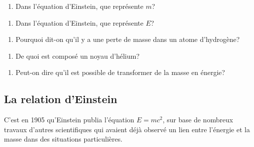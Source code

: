\documentclass[
  letterpaper,
  DIV=11,
  numbers=noendperiod]{scrartcl}
\providecommand{\tightlist}{%
  \setlength{\itemsep}{0pt}\setlength{\parskip}{0pt}}\usepackage{longtable,booktabs,array}
\begin{document}
\vspace{1cm}

\begin{enumerate}
\def\labelenumi{\arabic{enumi}.}
\setcounter{enumi}{5}
\tightlist
\item
  Dans l'équation d'Einstein, que représente \(m\)?
\end{enumerate}

\vspace{1cm}

\begin{enumerate}
\def\labelenumi{\arabic{enumi}.}
\setcounter{enumi}{5}
\tightlist
\item
  Dans l'équation d'Einstein, que représente \(E\)?
\end{enumerate}

\vspace{1cm}

\begin{enumerate}
\def\labelenumi{\arabic{enumi}.}
\setcounter{enumi}{6}
\tightlist
\item
  Pourquoi dit-on qu'il y a une perte de masse dans un atome
  d'hydrogène?
\end{enumerate}

\vspace{3cm}

\begin{enumerate}
\def\labelenumi{\arabic{enumi}.}
\setcounter{enumi}{7}
\tightlist
\item
  De quoi est composé un noyau d'hélium?
\end{enumerate}

\vspace{1cm}

\begin{enumerate}
\def\labelenumi{\arabic{enumi}.}
\setcounter{enumi}{8}
\tightlist
\item
  Peut-on dire qu'il est possible de transformer de la masse en énergie?
\end{enumerate}

\vspace{4cm}

\subsection{La relation d'Einstein}\label{la-relation-deinstein-1}

C'est en 1905 qu'Einstein publia l'équation \(E=mc^2\), sur base de
nombreux travaux d'autres scientifiques qui avaient déjà observé un lien
entre l'énergie et la masse dans des situations particulières.
\end{document}
